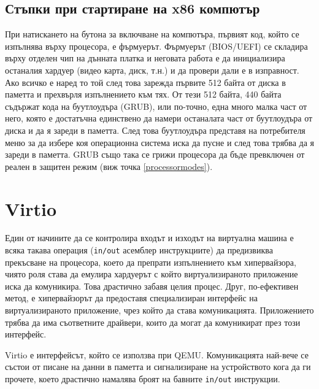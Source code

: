   \subsection{Стъпки при стартиране на x86 компютър}
  При натискането на бутона за включване на компютъра, първият код, който се изпълнява върху процесора, е фърмуерът. Фърмуерът (BIOS/UEFI) се складира върху отделен чип на дънната платка и неговата работа е да инициализира останалия хардуер (видео карта, диск, т.н.) и да провери дали е в изправност. Ако всичко е наред то той след това зарежда първите 512 байта от диска в паметта и прехвърля изпълнението към тях. От тези 512 байта, 440 байта съдържат кода на буутлоудъра (GRUB), или по-точно, една много малка част от него, която е достатъчна единствено да намери останалата част от буутлоудъра от диска и да я зареди в паметта. След това буутлоудъра представя на потребителя меню за да избере коя операционна система иска да пусне и след това трябва да я зареди в паметта. GRUB също така се грижи процесора да бъде превключен от реален в защитен режим (виж точка \ref{processormodes}).

\section{Virtio}

Един от начините да се контролира входът и изходът на виртуална машина е всяка такава операция ({\tt in/out} асемблер инструкциите) да предизвиква прекъсване на процесора, което да препрати изпълнението към хипервайзора, чиято роля става да емулира хардуерът с който виртуализираното приложение иска да комуникира. Това драстично забавя целия процес.\cite{vmware-whitepaper} Друг, по-ефективен метод, е хипервайзорът да предоставя специализиран интерфейс на виртуализираното приложение, чрез който да става комуникацията. Приложението трябва да има съответните драйвери, които да могат да комуникират през този интерфейс.

Virtio е интерфейсът, който се използва при QEMU. Комуникацията най-вече се състои от писане на данни в паметта и сигнализиране на устройството кога да ги прочете, което драстично намалява броят на бавните {\tt in/out} инструкции.

